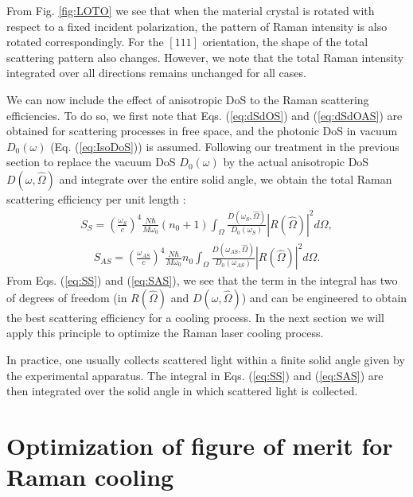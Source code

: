 \documentclass[%
 reprint,
superscriptaddress,
 amsmath,amssymb,
 aps,
pra,
]{revtex4-1}
\begin{document}
From Fig. \ref{fig:LOTO} we see that when the material crystal is rotated with respect to a fixed incident polarization, the pattern of Raman intensity is also rotated correspondingly. For the $[111]$ orientation, the shape of the total scattering pattern also changes. However, we note that the total Raman intensity integrated over all directions remains unchanged for all cases.

\vspace{10pt}

We can now include the effect of anisotropic DoS to the Raman scattering efficiencies. To do so, we first note that
Eqs. (\ref{eq:dSdOS}) and (\ref{eq:dSdOAS}) are obtained for scattering processes in free space, and the photonic DoS in vacuum $D_0(\omega)$ (Eq. (\ref{eq:IsoDoS})) is assumed. Following our treatment in the previous section to replace the vacuum DoS $D_0(\omega)$ by the actual anisotropic DoS $D(\omega,\hat{\Omega})$ and integrate over the entire solid angle, we obtain the total Raman scattering efficiency per unit length \cite{chen2015raman}:
\begin{align}\label{eq:SS}
S_{S}
	=\left (\frac{\omega_S}{c} \right )^4
	\frac{N\hbar}{M\omega_0}(n_0+1)
	\int_{\Omega}\frac{D(\omega_{S},\hat{\Omega})}{D_0(\omega_{S})}
	|R(\hat{\Omega})|^2d\Omega, 
\end{align}
\begin{align}\label{eq:SAS}
S_{AS}
	=\left (\frac{\omega_{AS}}{c} \right )^4
	\frac{N\hbar}{M\omega_0}n_0
	\int_{\Omega}\frac{D(\omega_{AS},\hat{\Omega})}{D_0(\omega_{AS})}
	|R(\hat{\Omega})|^2d\Omega.
\end{align}
From Eqs. (\ref{eq:SS}) and (\ref{eq:SAS}), we see that the term in the integral has two of degrees of freedom (in $R(\hat{\Omega})$ and $D(\omega,\hat{\Omega})$) and can be engineered to obtain the best scattering efficiency for a cooling process. In the next section we will apply this principle to optimize the Raman laser cooling process.

{In practice, one usually collects scattered light within a finite solid angle given by the experimental apparatus. The integral in } Eqs. (\ref{eq:SS}) and (\ref{eq:SAS}) {are then integrated over the solid angle in which scattered light is collected.}


\section{Optimization of figure of merit for Raman cooling}\label{sec:FoM}
\end{document}

